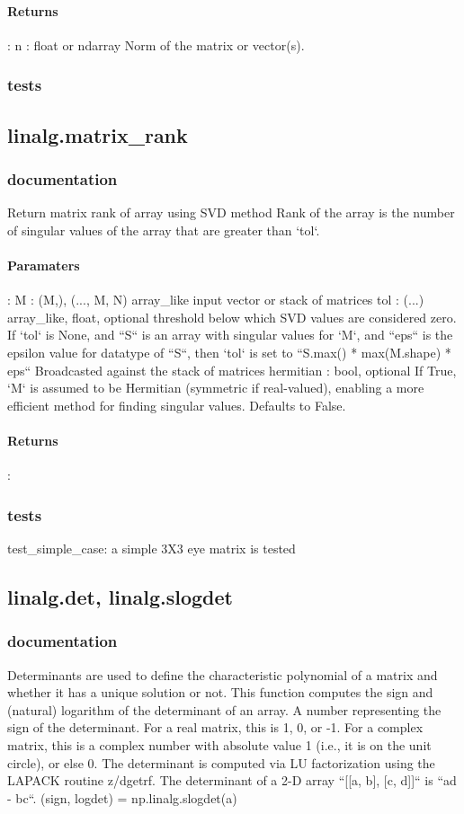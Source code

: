 \documentclass[a4paper,11pt]{article}
\begin{document}
\paragraph{Returns}:    
n : float or ndarray
Norm of the matrix or vector(s).\\

\subsubsection{tests}


\subsection{linalg.matrix\_rank}
\subsubsection{documentation}
Return matrix rank of array using SVD method
Rank of the array is the number of singular values of the array that are
greater than `tol`.
\paragraph{Paramaters}:  M : {(M,), (..., M, N)} array\_like input vector or stack of matrices
tol : (...) array\_like, float, optional
threshold below which SVD values are considered zero. If `tol` is None, and ``S`` is an array with singular values for `M`, and ``eps`` is the epsilon value for datatype of ``S``, then `tol` is set to ``S.max() * max(M.shape) * eps`` Broadcasted against the stack of matrices hermitian : bool, optional If True, `M` is assumed to be Hermitian (symmetric if real-valued),
enabling a more efficient method for finding singular values. Defaults to False.
\paragraph{Returns}: 
\subsubsection{tests}
test\_simple\_case: a simple 3X3 eye matrix is tested 


\subsection{linalg.det, linalg.slogdet}
\subsubsection{documentation}
Determinants are used to define the characteristic polynomial of a matrix and whether it has a unique solution or not. This function computes the sign and (natural) logarithm of the determinant of an array. A number representing the sign of the determinant. For a real matrix,
this is 1, 0, or -1. For a complex matrix, this is a complex number with absolute value 1 (i.e., it is on the unit circle), or else 0. The determinant is computed via LU factorization using the LAPACK
routine z/dgetrf. The determinant of a 2-D array ``[[a, b], [c, d]]`` is ``ad - bc``. (sign, logdet) = np.linalg.slogdet(a)
\end{document}
